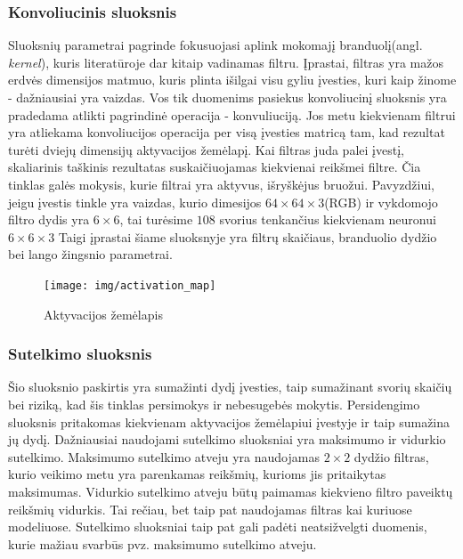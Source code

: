 \documentclass{VUMIFPSkursinis}
\DeclareRobustCommand{\[}{\begin{equation}}
\DeclareRobustCommand{\]}{\end{equation}}
\begin{document}
\subsubsection{Konvoliucinis sluoksnis}
Sluoksnių parametrai pagrinde fokusuojasi aplink mokomajį branduolį(angl. \textit{kernel}), kuris literatūroje dar kitaip vadinamas filtru. Įprastai, filtras yra mažos erdvės dimensijos matmuo, kuris plinta išilgai visu gyliu įvesties, kuri kaip žinome - dažniausiai yra vaizdas. Vos tik duomenims pasiekus konvoliucinį sluoksnis yra pradedama atlikti pagrindinė operacija - konvuliuciją. Jos metu kiekvienam filtrui yra atliekama konvoliucijos operacija per visą įvesties matricą tam, kad rezultat turėti dviejų dimensijų aktyvacijos žemėlapį.
\newline
Kai filtras juda palei įvestį, skaliarinis taškinis rezultatas suskaičiuojamas kiekvienai reikšmei filtre. Čia tinklas galės mokysis, kurie filtrai yra aktyvus, išryškėjus bruožui.
Pavyzdžiui, jeigu įvestis tinkle yra vaizdas, kurio dimesijos $64\times 64 \times 3$(RGB) ir vykdomojo filtro dydis yra $6\times 6$, tai turėsime $108$ svorius tenkančius kiekvienam neuronui $6\times 6 \times 3$
Taigi įprastai šiame sluoksnyje yra filtrų skaičiaus, branduolio dydžio bei lango žingsnio parametrai.
\begin{figure}[H]
\centering
\texttt{[image: img/activation\_map]}
\caption{Aktyvacijos žemėlapis
\cite{Improved_triplet_network}} %
\label{img:mlp}
\end{figure}

\pagebreak

\subsubsection{Sutelkimo sluoksnis}
Šio sluoksnio paskirtis yra sumažinti dydį įvesties, taip sumažinant svorių skaičių bei riziką, kad šis tinklas persimokys ir nebesugebės mokytis. Persidengimo sluoksnis pritakomas kiekvienam aktyvacijos žemėlapiui įvestyje ir taip sumažina jų dydį. Dažniausiai naudojami sutelkimo sluoksniai yra maksimumo
ir vidurkio sutelkimo. Maksimumo sutelkimo atveju yra naudojamas $2\times 2$ dydžio filtras, kurio veikimo metu yra parenkamas reikšmių, kurioms jis pritaikytas maksimumas.
Vidurkio sutelkimo atveju būtų paimamas kiekvieno filtro paveiktų reikšmių vidurkis. Tai
rečiau, bet taip pat naudojamas filtras kai kuriuose modeliuose. Sutelkimo sluoksniai taip pat gali
padėti neatsižvelgti duomenis, kurie mažiau svarbūs pvz. maksimumo sutelkimo atveju.
\end{document}
